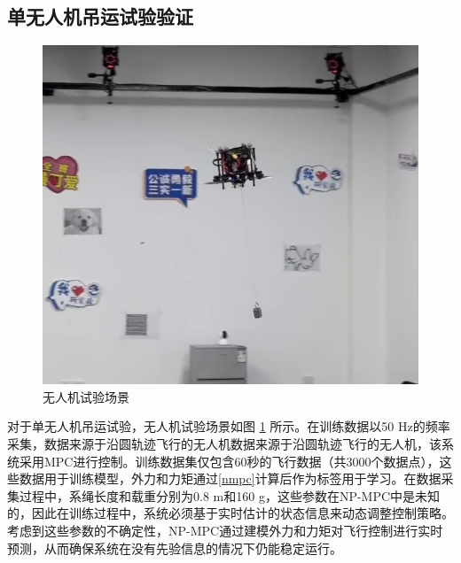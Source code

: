 \documentclass[lang=chs, degree=master, blindreview=false, winfonts=true]{yanputhesis}
\begin{document}
\subsection{单无人机吊运试验验证}
\begin{figure}[hbt!]
	\centering
	\includegraphics[width=28pc]{picture/danjireal.png} 
	\caption{无人机试验场景} 
	\label{dan}
\end{figure}
对于单无人机吊运试验，无人机试验场景如图 \ref{dan} 所示。在训练数据以50 Hz的频率采集，数据来源于沿圆轨迹飞行的无人机数据来源于沿圆轨迹飞行的无人机，该系统采用MPC进行控制。训练数据集仅包含60秒的飞行数据（共3000个数据点），这些数据用于训练模型，外力和力矩通过\autoref{nmpc}计算后作为标签用于学习。在数据采集过程中，系绳长度和载重分别为0.8 m和160 g，这些参数在NP-MPC中是未知的，因此在训练过程中，系统必须基于实时估计的状态信息来动态调整控制策略。考虑到这些参数的不确定性，NP-MPC通过建模外力和力矩对飞行控制进行实时预测，从而确保系统在没有先验信息的情况下仍能稳定运行。
\end{document}
